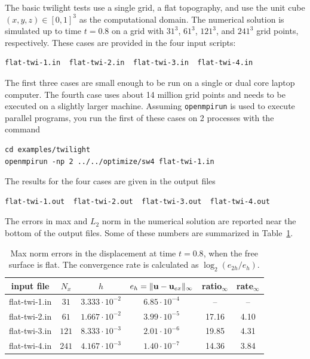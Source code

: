 \documentclass[11pt]{report}
\newcommand{\ub}{{\bf u}}
\begin{document}
The basic twilight tests use a single grid, a flat topography, and use the unit cube
$(x,y,z)\in[0,1]^3$ as the computational domain. The numerical solution is simulated up to time
$t=0.8$ on a grid with $31^3$, $61^3$, $121^3$, and $241^3$ grid points, respectively. These cases
are provided in the four input scripts:
\begin{verbatim}
flat-twi-1.in  flat-twi-2.in  flat-twi-3.in  flat-twi-4.in
\end{verbatim}
The first three cases are small enough to be run on a single or dual core laptop computer. The
fourth case uses about 14 million grid points and needs to be executed on a slightly larger
machine. Assuming \verb+openmpirun+ is used to execute parallel programs, you run the first of these
cases on 2 processes with the command
\begin{verbatim}
cd examples/twilight
openmpirun -np 2 ../../optimize/sw4 flat-twi-1.in
\end{verbatim}
The results for the four cases are given in the output files
\begin{verbatim}
flat-twi-1.out  flat-twi-2.out  flat-twi-3.out  flat-twi-4.out
\end{verbatim}
The errors in max and $L_2$ norm in the numerical solution are reported near the bottom of the
output files. Some of these numbers are summarized in Table~\ref{tab:twi-err}.
\begin{table}
\begin{center}
\begin{tabular}{| c | c | c | c | c  | c | }
\hline
input file & $N_x$ & $h$ & $e_h=\| \ub - \ub_{ex}\|_\infty$ & ratio$_\infty$ & rate$_\infty$ \\ \hline
flat-twi-1.in & $31$  & $3.333\cdot 10^{-2}$  & $6.85\cdot 10^{-4}$ & --   & --   \\ \hline
flat-twi-2.in & $61$  & $1.667\cdot 10^{-2}$  & $3.99\cdot 10^{-5}$ &17.16 & 4.10 \\ \hline
flat-twi-3.in & $121$ & $8.333\cdot 10^{-3}$  & $2.01\cdot 10^{-6}$ &19.85 & 4.31 \\ \hline
flat-twi-4.in & $241$ & $4.167\cdot 10^{-3}$  & $1.40\cdot 10^{-7}$ &14.36 & 3.84 \\ \hline
\end{tabular}
\caption{Max norm errors in the displacement at time $t=0.8$, when the free
  surface is flat. The convergence rate is calculated as $\log_2(e_{2h}/e_h)$.}
\label{tab:twi-err}
\end{center}
\end{table}
\end{document}
